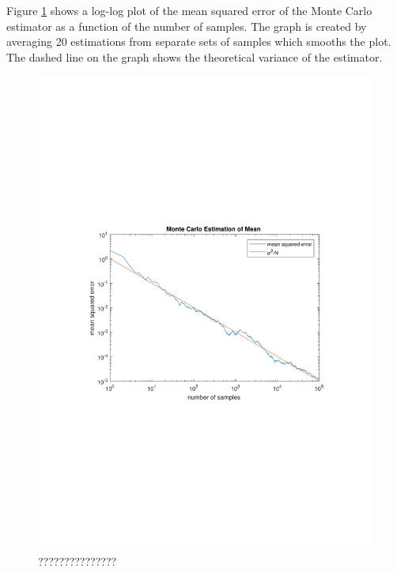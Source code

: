 \documentclass[12pt]{article}
\begin{document}
Figure \ref{fig:mote-mean} shows a log-log plot of the mean squared error of the Monte Carlo estimator as a function of the number of samples.
The graph is created by averaging 20 estimations from separate sets of samples which smooths the plot.
The dashed line on the graph shows the theoretical variance of the estimator.

\begin{figure}[htb]
\includegraphics[width=\textwidth]{figures/mote-carlo-mean-estimator.pdf}
  \caption{???????????????}
  \label{fig:mote-mean}
\end{figure}
\end{document}

